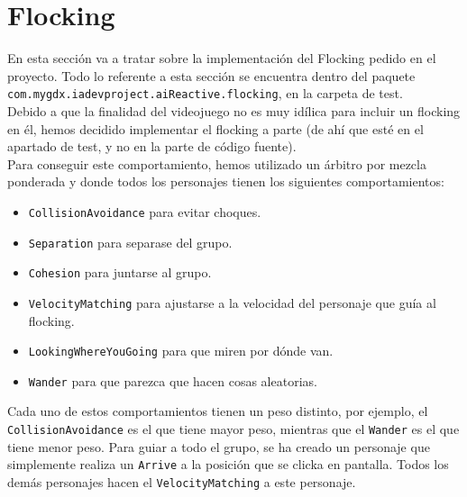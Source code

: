 \medskip
\section{Flocking}
En esta sección va a tratar sobre la implementación del Flocking pedido en el proyecto. Todo lo referente a esta sección se encuentra dentro del paquete \texttt{com.mygdx.iadevproject.aiReactive.flocking}, en la carpeta de test. \\

Debido a que la finalidad del videojuego no es muy idílica para incluir un flocking en él, hemos decidido implementar el flocking a parte (de ahí que esté en el apartado de test, y no en la parte de código fuente). \\

Para conseguir este comportamiento, hemos utilizado un árbitro por mezcla ponderada y donde todos los personajes tienen los siguientes comportamientos:
\begin{itemize}
 \item \texttt{CollisionAvoidance} para evitar choques.
 \item \texttt{Separation} para separase del grupo.
 \item \texttt{Cohesion} para juntarse al grupo.
 \item \texttt{VelocityMatching} para ajustarse a la velocidad del personaje que guía al flocking.
 \item \texttt{LookingWhereYouGoing} para que miren por dónde van.
 \item \texttt{Wander} para que parezca que hacen cosas aleatorias.
\end{itemize}

Cada uno de estos comportamientos tienen un peso distinto, por ejemplo, el \texttt{CollisionAvoidance} es el que tiene mayor peso, mientras que el \texttt{Wander} es el que tiene menor peso. Para guiar a todo el grupo, se ha creado un personaje que simplemente realiza un \texttt{Arrive} a la posición que se clicka en pantalla. Todos los demás personajes hacen el \texttt{VelocityMatching} a este personaje.
